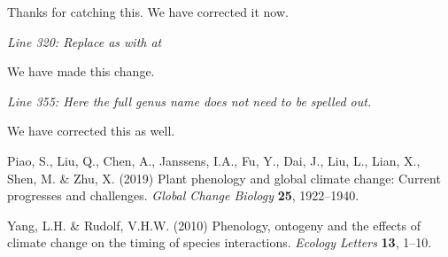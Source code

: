 \documentclass[11pt]{article}
\begin{document}
Thanks for catching this. We have corrected it now.

\emph{Line 320: Replace as with at}

We have made this change.

\emph{Line 355: Here the full genus name does not need to be spelled out.}

We have corrected this as well.


\begin{thebibliography}{61}
\providecommand{\natexlab}[1]{#1}

Piao, S., Liu, Q., Chen, A., Janssens, I.A., Fu, Y., Dai, J., Liu, L., Lian,
  X., Shen, M. \& Zhu, X. (2019) Plant phenology and global climate change:
  Current progresses and challenges. \emph{Global Change Biology} \textbf{25},
  1922--1940.

Yang, L.H. \& Rudolf, V.H.W. (2010) Phenology, ontogeny and the effects of
  climate change on the timing of species interactions. \emph{Ecology Letters}
  \textbf{13}, 1--10.


\end{thebibliography}
\end{document}
